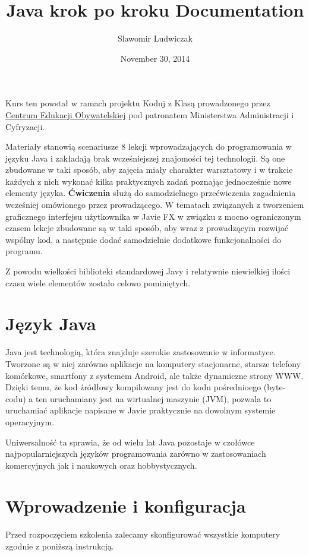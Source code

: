 \documentclass[letterpaper,10pt,english]{sphinxmanual}
\title{Java krok po kroku Documentation}
\date{November 30, 2014}
\author{Slawomir Ludwiczak}
\begin{document}
\maketitle
\tableofcontents
{}\label{index::doc}


Kurs ten powstał w ramach projektu Koduj z Klasą prowadzonego przez \href{http://www.ceo.org.pl/}{Centrum Edukacji Obywatelskiej} pod patronatem Ministerstwa Administracji i Cyfryzacji.

Materiały stanowią scenariusze 8 lekcji wprowadzających do programowania w języku Java i zakładają brak wcześniejszej znajomości tej technologii. Są one zbudowane w taki sposób, aby zajęcia miały charakter warsztatowy i w trakcie każdych z nich wykonać kilka praktycznych zadań poznając jednocześnie nowe elementy języka. \textbf{Ćwiczenia} służą do samodzielnego przećwiczenia zagadnienia wcześniej omówionego przez prowadzącego. W tematach związanych z tworzeniem graficznego interfejsu użytkownika w Javie FX w związku z mocno ograniczonym czasem lekcje zbudowane są w taki sposób, aby wraz z prowadzącym rozwijać wspólny kod, a następnie dodać samodzielnie dodatkowe funkcjonalności do programu.

Z powodu wielkości biblioteki standardowej Javy i relatywnie niewielkiej ilości czasu wiele elementów zostało celowo pominiętych.


\chapter{Język Java}
\label{index:jezyk-java}\label{index:kurs-java-krok-po-kroku}\label{index:centrum-edukacji-obywatelskiej}
Java jest technologią, która znajduje szerokie zastosowanie w informatyce. Tworzone są w niej zarówno aplikacje na komputery stacjonarne, starsze telefony komórkowe, smartfony z systemem Android, ale także dynamiczne strony WWW. Dzięki temu, że kod źródłowy kompilowany jest do kodu pośrednioego (byte-codu) a ten uruchamiany jest na wirtualnej maszynie (JVM), pozwala to uruchamiać aplikacje napisane w Javie praktycznie na dowolnym systemie operacyjnym.

Uniwersalność ta sprawia, że od wielu lat Java pozostaje w czołówce najpopularniejszych języków programowania zarówno w zastosowaniach komercyjnych jak i naukowych oraz hobbystycznych.


\chapter{Wprowadzenie i konfiguracja}
\label{index:wprowadzenie-i-konfiguracja}
Przed rozpoczęciem szkolenia zalecamy skonfigurować wszystkie komputery zgodnie z poniższą instrukcją.
\end{document}
